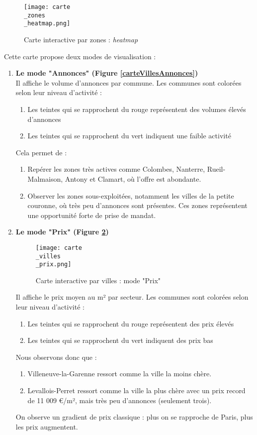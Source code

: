 \documentclass[a4paper, 12pt, twoside]{report}
\begin{document}
		\begin{figure}[h]
			\centering
			\texttt{[image: carte\\\_zones\\\_heatmap.png]}
			\caption{Carte interactive par zones : {\it heatmap}}
			\label{carteZonesHeatmap}
		\end{figure}	

		Cette carte propose deux modes de visualisation : \\
		\begin{enumerate}
			\item {\bf Le mode "Annonces" (Figure \ref{carteVillesAnnonces})} \\
			Il affiche le volume d’annonces par commune. Les communes sont colorées selon leur niveau d’activité :
			\begin{enumerate}
				\item Les teintes qui se rapprochent du rouge représentent des volumes élevés d’annonces
				\item Les teintes qui se rapprochent du vert indiquent une faible activité
			\end{enumerate}
			Cela permet de :
			\begin{enumerate}
				\item Repérer les zones très actives comme Colombes, Nanterre, Rueil-Malmaison, Antony et Clamart, où l’offre est abondante.
				\item Observer les zones sous-exploitées, notamment les villes de la petite couronne, où très peu d’annonces sont présentes. Ces zones représentent une opportunité forte de prise de mandat. \\
			\end{enumerate}
			\item {\bf Le mode "Prix" (Figure \ref{carteVillesPrix})} \\
			\begin{figure}[h]
				\centering
				\texttt{[image: carte\\\_villes\\\_prix.png]}
				\caption{Carte interactive par villes : mode "Prix"}
				\label{carteVillesPrix}
			\end{figure}	
			Il affiche le prix moyen au m² par secteur. Les communes sont colorées selon leur niveau d’activité :
			\begin{enumerate}
				\item Les teintes qui se rapprochent du rouge représentent des prix élevés
				\item Les teintes qui se rapprochent du vert indiquent des prix bas
			\end{enumerate}
			Nous observons donc que :
			\begin{enumerate}
				\item Villeneuve-la-Garenne ressort comme la ville la moins chère.
				\item Levallois-Perret ressort comme la ville la plus chère avec un prix record de 11 009 €/m², mais très peu d’annonces (seulement trois).
			\end{enumerate}
			On observe un gradient de prix classique : plus on se rapproche de Paris, plus les prix augmentent.
		\end{enumerate}
\end{document}
